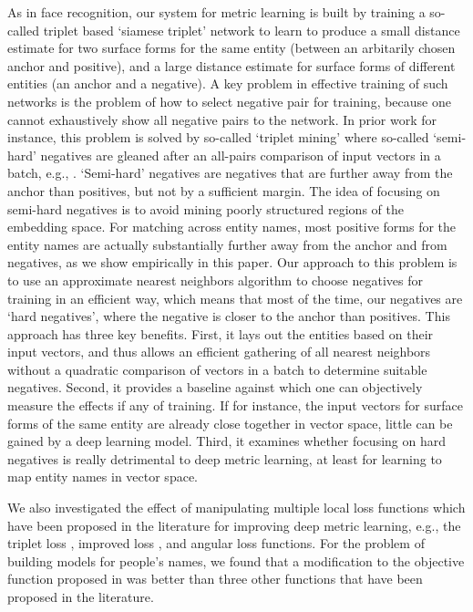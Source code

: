 As in face recognition, our system for metric learning is built by training a so-called triplet based `siamese triplet' network to learn to produce a small distance estimate for two surface forms for the same entity (between an arbitarily chosen anchor and positive), and a large distance estimate for surface forms of different entities (an anchor and a negative).  A key problem in effective training of such networks is the problem of how to select negative pair for training, because one cannot exhaustively show all negative pairs to the network.  In prior work for instance, this problem is solved by so-called `triplet mining' where so-called `semi-hard' negatives are gleaned after an all-pairs comparison of input vectors in a batch, e.g., \cite{DBLP:conf/cvpr/SchroffKP15}.  `Semi-hard' negatives are negatives that are further away from the anchor than positives, but not by a sufficient margin.  The idea of focusing on semi-hard negatives is to avoid mining poorly structured regions of the embedding space.  For matching across entity names, most positive forms for the entity names are actually substantially further away from the anchor and from negatives, as we show empirically in this paper.  Our approach to this problem is to use an approximate nearest neighbors algorithm to choose negatives for training in an efficient way, which means that most of the time, our negatives are `hard negatives', where the negative is closer to the anchor than positives.  This approach has three key benefits.  First, it lays out the entities based on their input vectors, and thus allows an efficient gathering of all nearest neighbors without a quadratic comparison of vectors in a batch to determine suitable negatives.  Second, it provides a baseline against which one can objectively measure the effects if any of training.  If for instance, the input vectors for surface forms of the same entity are already close together in vector space, little can be gained by a deep learning model.  Third, it examines whether focusing on hard negatives is really detrimental to deep metric learning, at least for learning to map entity names in vector space.

We also investigated the effect of manipulating multiple local loss functions which have been proposed in the literature for improving deep metric learning, e.g., the triplet loss \cite{DBLP:conf/cvpr/SchroffKP15}, improved loss \cite{Zhang:2016:DML:3088616.3088665}, and angular loss \cite{DBLP:journals/corr/abs-1708-01682} functions.  For the problem of building models for people's names, we found that a modification to the objective function proposed in \cite{DBLP:conf/cvpr/SchroffKP15} was better than three other functions that have been proposed in the literature. 

